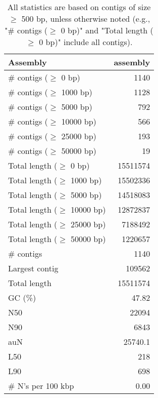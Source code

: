 \documentclass[12pt,a4paper]{article}
\begin{document}
\begin{table}[ht]
\begin{center}
\caption{All statistics are based on contigs of size $\geq$ 500 bp, unless otherwise noted (e.g., "\# contigs ($\geq$ 0 bp)" and "Total length ($\geq$ 0 bp)" include all contigs).}
\begin{tabular}{|l*{1}{|r}|}
\hline
Assembly & assembly \\ \hline
\# contigs ($\geq$ 0 bp) & 1140 \\ \hline
\# contigs ($\geq$ 1000 bp) & 1128 \\ \hline
\# contigs ($\geq$ 5000 bp) & 792 \\ \hline
\# contigs ($\geq$ 10000 bp) & 566 \\ \hline
\# contigs ($\geq$ 25000 bp) & 193 \\ \hline
\# contigs ($\geq$ 50000 bp) & 19 \\ \hline
Total length ($\geq$ 0 bp) & 15511574 \\ \hline
Total length ($\geq$ 1000 bp) & 15502336 \\ \hline
Total length ($\geq$ 5000 bp) & 14518083 \\ \hline
Total length ($\geq$ 10000 bp) & 12872837 \\ \hline
Total length ($\geq$ 25000 bp) & 7188492 \\ \hline
Total length ($\geq$ 50000 bp) & 1220657 \\ \hline
\# contigs & 1140 \\ \hline
Largest contig & 109562 \\ \hline
Total length & 15511574 \\ \hline
GC (\%) & 47.82 \\ \hline
N50 & 22094 \\ \hline
N90 & 6843 \\ \hline
auN & 25740.1 \\ \hline
L50 & 218 \\ \hline
L90 & 698 \\ \hline
\# N's per 100 kbp & 0.00 \\ \hline
\end{tabular}
\end{center}
\end{table}
\end{document}
